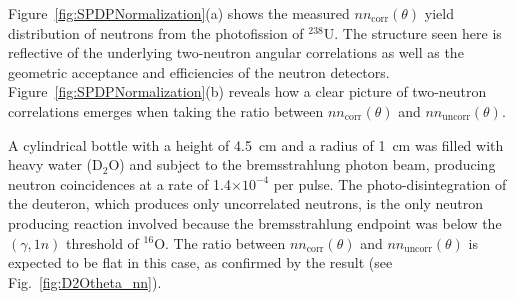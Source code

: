 Figure~\ref{fig:SPDPNormalization}(a) shows the measured $nn_{\text{corr}}(\theta)$ yield distribution of neutrons from the photofission of $^{238}$U.
The structure seen here is reflective of the underlying two-neutron angular correlations as well as the geometric acceptance and efficiencies of the neutron detectors.
Figure~\ref{fig:SPDPNormalization}(b) reveals how a clear picture of two-neutron correlations emerges when taking the ratio between $nn_{\text{corr}}(\theta)$ and $nn_{\text{uncorr}}(\theta)$.

A cylindrical bottle with a height of 4.5~cm and a radius of 1~cm was filled with heavy water 
(D$_{2}$O) and subject to the bremsstrahlung photon beam, producing neutron coincidences at a rate of 1.4$\times10^{-4}$ per pulse.
The photo-disintegration of the deuteron, which produces only uncorrelated neutrons, is the only  neutron producing reaction involved because the bremsstrahlung endpoint was below the $(\gamma, 1n)$ threshold of $^{16}$O.
The ratio between $nn_{\text{corr}}(\theta)$ and $nn_{\text{uncorr}}(\theta)$ is expected to be flat in this case, as confirmed by the result (see Fig.~\ref{fig:D2Otheta_nn}).

